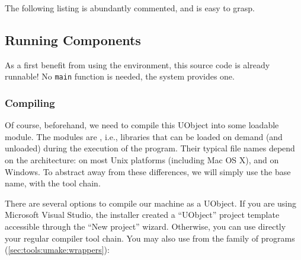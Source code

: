 The following listing is abundantly commented, and is easy to grasp.


\subsection{Running Components}
\label{sec:uob:quick:run}
%


As a first benefit from using the \urbi environment, this source code is
already runnable!  No \lstinline|main| function is needed, the \urbi system
provides one.

\subsubsection{Compiling}
Of course, beforehand, we need to compile this UObject into some loadable
module.  The \urbi modules are , i.e., libraries that
can be loaded on demand (and unloaded) during the execution of the program.
Their typical file names depend on the architecture:  on
most Unix platforms (including Mac OS X), and  on Windows.
To abstract away from these differences, we will simply use the base name,
 with the \urbi tool chain.

There are several options to compile our machine as a UObject.  If you are
using Microsoft Visual Studio, the \usdk installer created a ``UObject''
project template accessible through the ``New project'' wizard.  Otherwise,
you can use directly your regular compiler tool chain.  You may also use
 from the  family of programs
(\autoref{sec:tools:umake:wrappers}):


